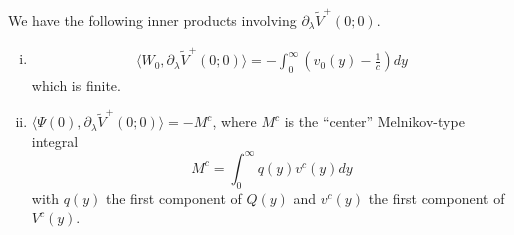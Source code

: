 \documentclass[thesis.tex]{subfiles}
\begin{document}
\begin{lemma}\label{lemma:VderivIPs}
We have the following inner products involving $\partial_\lambda \tilde{V}^+(0; 0)$. 
\begin{enumerate}[(i)]
\item
\begin{align*}
\langle W_0, \partial_\lambda \tilde{V}^+(0; 0) \rangle
= -\int_0^{\infty} \left(v_0(y) - \frac{1}{c}\right) dy
\end{align*}
which is finite.
\item $\langle \Psi(0), \partial_\lambda \tilde{V}^+(0; 0) \rangle = - M^c$,
where $M^c$ is the ``center'' Melnikov-type integral
\begin{equation}\label{defMc}
M^c = \int_0^\infty q(y) v^c(y) dy
\end{equation}
with $q(y)$ the first component of $Q(y)$ and $v^c(y)$ the first component of $V^c(y)$.


\end{enumerate}
\end{lemma}
\end{document}

